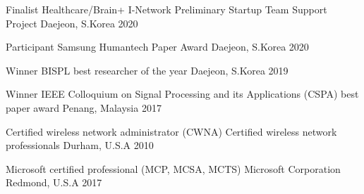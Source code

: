 



\begin{cvhonors}

  \cvhonor
    {Finalist} %
    {Healthcare/Brain+ I-Network Preliminary Startup Team Support Project} %
    {Daejeon, S.Korea} %
    {2020} %

  \cvhonor
    {Participant} %
    {Samsung Humantech Paper Award} %
    {Daejeon, S.Korea} %
    {2020} %
    
  \cvhonor
    {Winner} %
    {BISPL best researcher of the year} %
    {Daejeon, S.Korea} %
    {2019} %

  \cvhonor
    {Winner} %
    {IEEE Colloquium on Signal Processing and its Applications (CSPA) best paper award} %
    {Penang, Malaysia} %
    {2017} %

\end{cvhonors}



\begin{cvhonors}

  \cvhonor
    {Certified wireless network administrator (CWNA)} %
    {Certified wireless network professionals} %
    {Durham, U.S.A} %
    {2010} %

  \cvhonor
    {Microsoft certified professional (MCP, MCSA, MCTS)} %
    {Microsoft Corporation} %
    {Redmond, U.S.A} %
    {2017} %

\end{cvhonors}

